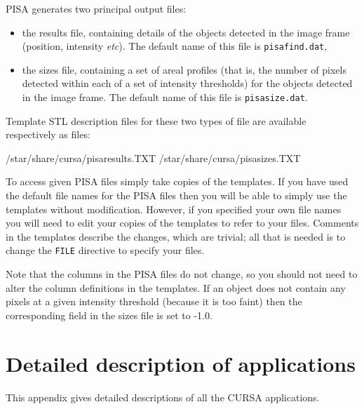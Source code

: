 \documentclass[twoside,11pt]{starlink}
\begin{document}
PISA generates two principal output files:

\begin{itemize}

  \item the results file, containing details of the objects detected
   in the image frame (position, intensity \emph{etc}\/).  The default name
   of this file is \texttt{pisafind.dat},

  \item the sizes file, containing a set of areal profiles (that is,
   the number of pixels detected within each of a set of intensity
   thresholds) for the objects detected in the image frame.  The default
   name of this file is \texttt{pisasize.dat}.

\end{itemize}

Template STL description files for these two types of file are
available respectively as files:

\begin{terminalv}
/star/share/cursa/pisaresults.TXT
/star/share/cursa/pisasizes.TXT
\end{terminalv}

To access given PISA files simply take copies of the templates.  If
you have used the default file names for the PISA files then you will
be able to simply use the templates without modification.  However,
if you specified your own file names you will need to edit your copies
of the templates to refer to your files.  Comments in the templates
describe the changes, which are trivial; all that is needed is to
change the \texttt{FILE} directive to specify your files.

Note that the columns in the PISA files do not change, so you should
not need to alter the column definitions in the templates.  If an
object does not contain any pixels at a given intensity threshold
(because it is too faint) then the corresponding field in the sizes
file is set to -1.0.



\section{Detailed description of applications}

This appendix gives detailed descriptions of all the CURSA applications.
\end{document}
